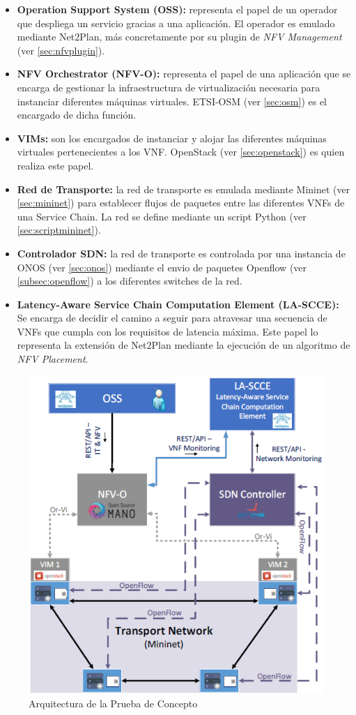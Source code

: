 \begin{itemize}
	\item \textbf{Operation Support System (OSS):} representa el papel de un operador que despliega un servicio gracias a una aplicación. El operador es emulado mediante Net2Plan, más concretamente por su plugin de \textit{NFV Management} (ver \ref{sec:nfvplugin}).
	
	\item \textbf{NFV Orchestrator (NFV-O):} representa el papel de una aplicación que se encarga de gestionar la infraestructura de virtualización necesaria para instanciar diferentes máquinas virtuales. ETSI-OSM (ver \ref{sec:osm}) es el encargado de dicha función.
	
	\item \textbf{\acp{VIM}:} son los encargados de instanciar y alojar las diferentes máquinas virtuales pertenecientes a los VNF. OpenStack (ver \ref{sec:openstack}) es quien realiza este papel.
	
	\item \textbf{Red de Transporte:} la red de transporte es emulada mediante Mininet (ver \ref{sec:mininet}) para establecer flujos de paquetes entre las diferentes VNFs de una Service Chain. La red se define mediante un script Python (ver \ref{sec:scriptmininet}).
	
	\item \textbf{Controlador SDN:} la red de transporte es controlada por una instancia de ONOS (ver \ref{sec:onos}) mediante el envio de paquetes Openflow (ver \ref{subsec:openflow}) a los diferentes switches de la red.
	
	\item \textbf{Latency-Aware Service Chain Computation Element (LA-SCCE):} Se encarga de decidir el camino a seguir para atravesar una secuencia de VNFs que cumpla con los requisitos de latencia máxima. Este papel lo representa la extensión de Net2Plan mediante la ejecución de un algoritmo de \textit{NFV Placement}. 
\end{itemize}


\begin{figure}[!ht]
	\centering
	\includegraphics[width=0.7\linewidth]{imagenes/esquema_demo}
	\caption{Arquitectura de la Prueba de Concepto}
	\label{fig:esquemademo}
\end{figure}

